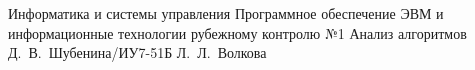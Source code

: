 \makereporttitle
    {Информатика и системы управления} %
    {Программное обеспечение ЭВМ и информационные технологии} %
    {рубежному контролю №1} %
    {Анализ алгоритмов} %
    {} %
    {} %
    {Д.~В.~Шубенина/ИУ7-51Б} %
	{Л.~Л.~Волкова} %